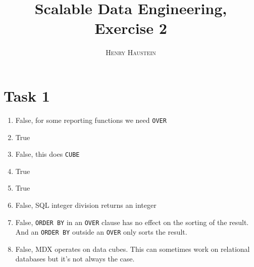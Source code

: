 \documentclass{article}
\title{\textbf{Scalable Data Engineering, Exercise 2}}
\author{\textsc{Henry Haustein}}
\date{}
\begin{document}
	\maketitle
	
	\section*{Task 1}
	\begin{enumerate}[label=(\alph*)]
		\item False, for some reporting functions we need \texttt{OVER}
		\item True
		\item False, this does \texttt{CUBE}
		\item True
		\item True
		\item False, SQL integer division returns an integer
		\item False, \texttt{ORDER BY} in an \texttt{OVER} clause has no effect on the sorting of the result. And an \texttt{ORDER BY} outside an \texttt{OVER} only sorts the result.
		\item False, MDX operates on data cubes. This can sometimes work on relational databases but it's not always the case.
	\end{enumerate}
\end{document}
